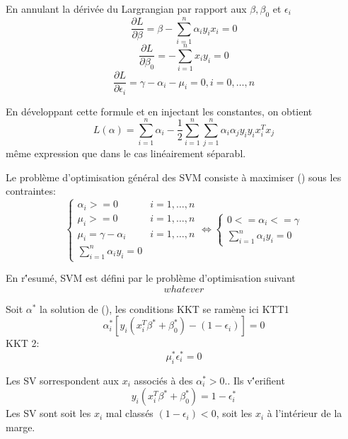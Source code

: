 \documentclass{article}
\begin{document}
En annulant la d\'eriv\'ee du Largrangian par rapport aux $\beta,\beta_0$ et $\epsilon_i$
\begin{equation}
\frac{\partial L}{\partial \beta}=\beta-\sum_{i=1}^n\alpha_iy_ix_i=0
\end{equation}
\begin{equation}
\frac{\partial L}{\partial \beta_0}=-\sum_{i=1}^n x_iy_i=0
\end{equation}
\begin{equation}
\frac{\partial L}{\partial \epsilon_i}=\gamma-\alpha_i-\mu_i=0,i=0,\ldots,n
\end{equation}

En d\'eveloppant cette formule et en injectant les constantes, on obtient 
\begin{equation}
L(\alpha)=\sum_{i=1}^n\alpha_i-\frac{1}{2}\sum_{i=1}^n\sum_{j=1}^n\alpha_i\alpha_jy_iy_ix^T_ix_j
\end{equation}
m\^eme expression que dans le cas lin\'eairement s\'eparabl.

Le probl\`eme d'optimisation g\'en\'eral des SVM consiste \`a maximiser ()  sous les contraintes:
\begin{equation}
\left\{\begin{array}{lcr}
\alpha_i>=0 & i=1,\ldots,n\\
\mu_i>=0 & i=1,\ldots,n\\
\mu_i=\gamma-\alpha_i & i=1,\ldots,n\\
\sum_{i=1}^n\alpha_iy_i=0
\end{array}\right.
\Leftrightarrow\left\{\begin{array}{l}
0<=\alpha_i<=\gamma\\
\sum_{i=1}^n\alpha_iy_i=0
\end{array}\right.
\end{equation}

En r\''esum\'e, SVM est d\'efini par le probl\`eme d'optimisation suivant
\begin{equation}
whatever
\end{equation}

Soit $\alpha^*$
 la solution de (),  les conditions KKT se ram\`ene ici KTT1
 \begin{equation}
 \alpha_i^*[y_i(x_i^T\beta^*+\beta^*_0)-(1-\epsilon_i)]=0
\end{equation}
KKT 2:
\begin{equation}
\mu_i^*\epsilon_i^*=0
\end{equation}

Les SV sorrespondent aux $x_i$ associ\'es \`a des $\alpha_i^*>0$.. Ils  v\''erifient
\begin{equation}
y_i(x_i^T\beta^*+\beta^*_0)=1-\epsilon_i^*
\end{equation}
Les SV sont soit les $x_i$
 mal class\'es $(1-\epsilon_i)<0$, soit les $x_i$ \`a l'int\'erieur de la marge.
 
\end{document}
